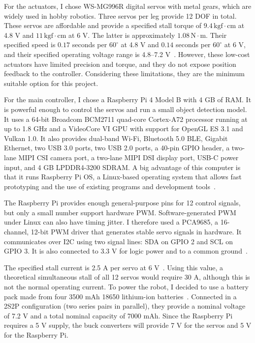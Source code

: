 \documentclass[a4paper,12pt]{report}
\begin{document}
For the actuators, I chose WS-MG996R digital servos with metal gears, which are widely used in
hobby robotics. Three servos per leg provide 12 DOF in total. These servos are affordable and
provide a specified stall torque of \(9.4\,\mathrm{kgf}\mathbin{\cdot}\mathrm{cm}\) at 4.8 V and
\(11\,\mathrm{kgf}\mathbin{\cdot}\mathrm{cm}\) at 6 V. The latter is approximately
\(1.08\,\mathrm{N}\mathbin{\cdot}\mathrm{m}\). Their specified speed is $0.17$ seconds per
$60^\circ$ at 4.8 V and $0.14$ seconds per $60^\circ$ at 6 V, and their specified operating
voltage range is 4.8--7.2 V~\parencite{mg996r}. However, these low-cost actuators have limited
precision and torque, and they do not expose position feedback to the controller. Considering these
limitations, they are the minimum suitable option for this project.

For the main controller, I chose a Raspberry Pi 4 Model B with 4 GB of RAM\@. It is
powerful enough to control the servos and run a small object detection model. It uses a 64-bit
Broadcom BCM2711
quad-core Cortex-A72 processor running at up to 1.8 GHz and a VideoCore VI GPU with support for
OpenGL ES 3.1 and Vulkan 1.0. It also provides dual-band Wi-Fi, Bluetooth 5.0 BLE, Gigabit Ethernet,
two USB 3.0 ports, two USB 2.0 ports, a 40-pin GPIO header, a two-lane MIPI CSI camera port, a
two-lane MIPI DSI display port, USB-C power input, and 4 GB LPDDR4-3200 SDRAM\@. A big advantage of
this computer is that it runs Raspberry Pi OS, a Linux-based operating system that allows fast
prototyping and the use of existing programs and development tools~\parencite{raspberrypi4}.

The Raspberry Pi provides enough general-purpose pins for 12 control signals, but only a small
number support hardware PWM\@. Software-generated PWM under Linux can also have timing jitter. I
therefore used a PCA9685, a 16-channel, 12-bit PWM driver that generates stable servo signals in
hardware. It communicates over I2C using two signal lines: SDA on GPIO 2 and SCL on GPIO 3. It is
also connected to 3.3 V for logic power and to a common ground~\parencite{pca9685}.

The specified stall current is 2.5 A per servo at 6 V~\parencite{mg996r}. Using this value, a
theoretical simultaneous stall of all 12 servos would require 30 A, although this is not the normal
operating current. To power the robot, I decided to use a battery pack made from four 3500 mAh 18650
lithium-ion batteries~\parencite{lgmj1}. Connected in a 2S2P configuration (two series pairs in
parallel), they provide a nominal voltage of 7.2 V and a total nominal capacity of 7000 mAh. Since
the Raspberry Pi requires a 5 V supply, the buck converters will provide 7 V for the servos and 5 V
for the Raspberry Pi.
\end{document}
